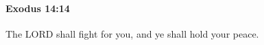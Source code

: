 
		\paragraph{Exodus 14:14} %
			\label{EXODUS-14-14}

			The LORD shall fight for you, and ye shall hold your peace.


